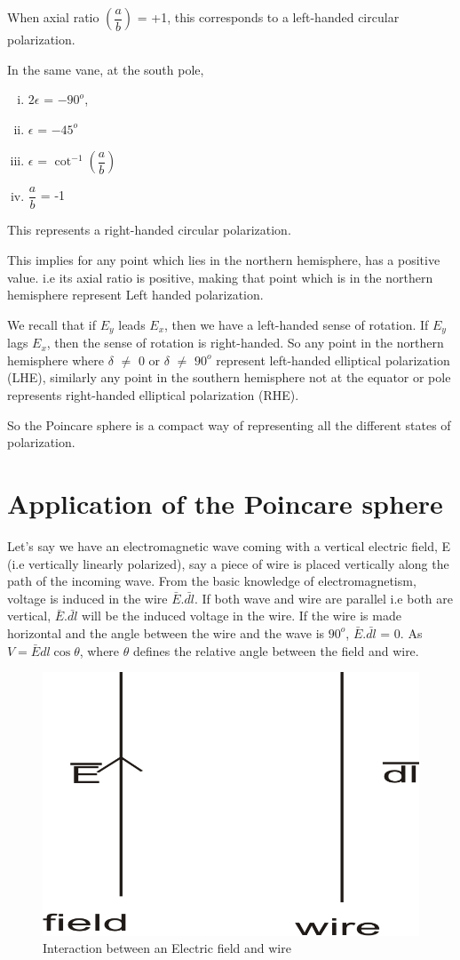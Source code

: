 When axial ratio $(\dfrac{a}{b})$ = +1, this corresponds to a left-handed circular polarization.

In the same vane, at the south pole,
\begin{enumerate}[(i)]
\item	$2\epsilon$ = $-90^{o}$, 
\item $\epsilon$ = $-45^{o}$
\item $\epsilon$ = $\cot^{-1}(\dfrac{a}{b})$
\item $\dfrac{a}{b}$ = -1
\end{enumerate}	
This represents a right-handed circular polarization.

This implies for any point which lies in the northern hemisphere, has a positive value. i.e its axial ratio is positive, making that point which is in the northern hemisphere represent Left handed polarization.

We recall that if $E_{y}$ leads $E_{x}$, then we have a left-handed sense of rotation. If $E_{y}$ lags $E_{x}$, then the sense of rotation is right-handed. So any point in the northern hemisphere where $\delta$ $\neq$ 0 or $\delta$ $\neq$ $90^{o}$ represent left-handed elliptical polarization  (LHE), similarly any point in the southern hemisphere not at the equator or pole represents right-handed elliptical polarization (RHE).

So the Poincare sphere is a compact way of representing all the different states of polarization.

\section{Application of the Poincare sphere}
Let's say we have an electromagnetic wave coming with a vertical electric field, E (i.e vertically linearly polarized), say a piece of wire is placed vertically along the path of the incoming wave. From the basic knowledge of electromagnetism, voltage is induced in the wire $\bar{E}$.$\bar{dl}$. If both wave and wire are parallel i.e both are vertical, $\bar{E}$.$\bar{dl}$ will be the induced voltage in the wire. If the wire is made horizontal and the angle between the wire and the wave is $90^{o}$, $\bar{E}$.$\bar{dl}$ = 0. As $ V = \bar{E}dl\cos\theta $, where $ \theta $ defines the relative angle between the field and wire.
\begin{figure}[h]
\centering
\includegraphics[width=.7\linewidth]{./graphics/interact}
\caption{Interaction between an Electric field and wire}
\label{fig:interact}
\end{figure}

